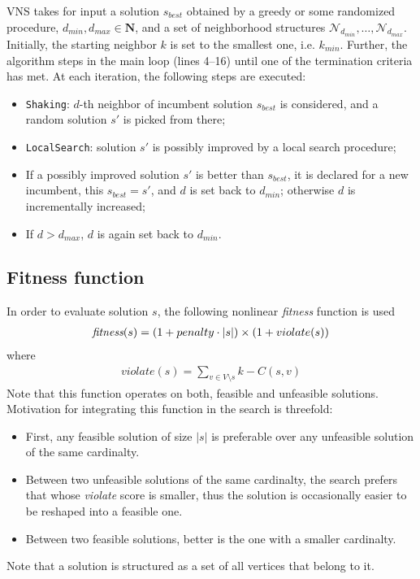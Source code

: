 \documentclass[dvipsnames,format=sigconf,anonymous=true,review=true]{acmart}
\begin{document}
 VNS takes for input a solution $s_{best}$ obtained by a greedy or some randomized procedure, $d_{min}, d_{max} \in \mathbf{N}$, 
  and a set of neighborhood structures $\mathcal{N}_{d_{min}}, \ldots, \mathcal{N}_{d_{max}}$.  
  Initially, the starting neighbor $k$ is set to the smallest one, i.e. $k_{min}$. Further, the algorithm steps in the main loop (lines 4--16) until one of the termination criteria has met. At each iteration, the following steps are executed: %
  
  \begin{itemize}
  	\item \texttt{Shaking}: $d$-th neighbor of incumbent solution $s_{best}$ is considered, and a random solution $s'$ is picked from there;
  	\item  \texttt{LocalSearch}: solution $s'$ is possibly improved by a local search procedure;
  	\item If a possibly improved solution $s'$ is better than $s_{best}$, it is declared for a new incumbent, this $s_{best} = s'$, and $d$ is set back to $d_{min}$; otherwise $d$ is incrementally increased;
  	\item  If $d> d_{max}$, $d$ is again set back to $d_{min}$.
   \end{itemize}
    

   \subsection{Fitness function}
       In order to evaluate solution $s$, the following nonlinear \emph{fitness} function is used 
       \begin{align}\label{eq:fitness}
          \emph{fitness}(s) = ( 1+ penalty \cdot |s|) \times ( 1 + violate(s))
       \end{align}
       where 
       \begin{align}
       	   violate(s) = \sum_{v \in V \setminus s}   k - C(s, v)  
       \end{align}
   Note that this function operates on both, feasible and unfeasible solutions. 
       Motivation for integrating this function  in the search is threefold:
       \begin{itemize}
       	\item First, any feasible solution of size $|s|$ is preferable over any unfeasible solution of the same cardinalty. 
       	\item Between two unfeasible solutions of the same cardinalty, the search prefers that whose \emph{violate} score is smaller, thus the solution is occasionally easier to be reshaped into a feasible one.  
       	\item Between two feasible solutions, better is the one with a smaller cardinalty. 
       \end{itemize}
     Note that a solution is structured as a set of all vertices that belong to it. 
   
\end{document}
